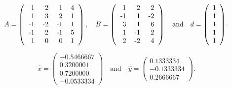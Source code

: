 {\newpage\clearpage
{}%
\begin{displaymath}  A = \left( \begin{tabular}{rrrr}
                  1 &  2 &  1 & 4 \\
                  1 &  3 &  2 & 1 \\
                 -1 & -2 & -1 & 1 \\
                 -1 &  2 & -1 & 5 \\
                  1 &  0 &  0 & 1
               \end{tabular} \right), \quad
    B = \left( \begin{tabular}{rrr}
                  1 &  2 &  2 \\
                 -1 &  1 & -2\\
                  3 &  1 &  6 \\
                  1 & -1 &  2 \\
                  2 & -2 &  4
               \end{tabular} \right)
    \quad \mbox{and} \quad
    d = \left( \begin{array}{r}
                   1 \\
                   1 \\
                   1 \\
                   1 \\
                   1
               \end{array} \right). \end{displaymath}%
\lthtmldisplayZ
\lthtmlcheckvsize\clearpage}

{\newpage\clearpage
{}%
\begin{displaymath}  \widehat {x} = \left( \begin{array}{r}
                            -0.5466667  \\
                             0.3200001  \\
                             0.7200000  \\
                            -0.0533334
                        \end{array} \right)
    \quad \mbox{and} \quad
    \widehat {y} = \left( \begin{array}{r}
                         0.1333334 \\
                        -0.1333334 \\
                         0.2666667
                    \end{array} \right).\end{displaymath}%
\lthtmldisplayZ
\lthtmlcheckvsize\clearpage}

